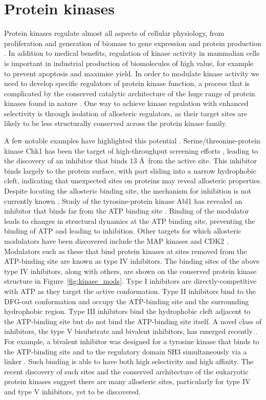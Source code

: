 \section{Protein kinases}

Protein kinases regulate almost all aspects of cellular physiology, from proliferation and generation of biomass to gene expression and protein production \cite{Manning2002}.
In addition to medical benefits, regulation of kinase activity in mammalian cells is important in industrial production of biomolecules of high value, for example to prevent apoptosis and maximise yield.
In order to modulate kinase activity we need to develop specific regulators of protein kinase function, a process that is complicated by the conserved catalytic architecture of the huge range of protein kinases found in nature \cite{Muller2015}.
One way to achieve kinase regulation with enhanced selectivity is through isolation of allosteric regulators, as their target sites are likely to be less structurally conserved across the protein kinase family.

A few notable examples have highlighted this potential \cite{Gavrin2013}.
Serine/threonine-protein kinase Chk1 has been the target of high-throughput screening efforts \cite{Converso2009}, leading to the discovery of an inhibitor that binds 13 \AA\ from the active site.
This inhibitor binds largely to the protein surface, with part sliding into a narrow hydrophobic cleft, indicating that unexpected sites on proteins may reveal allosteric properties.
Despite locating the allosteric binding site, the mechanism for inhibition is not currently known \cite{Vanderpool2009}.
Study of the tyrosine-protein kinase Abl1 has revealed an inhibitor that binds far from the ATP binding site \cite{Zhang2010, Yang2011}.
Binding of the modulator leads to changes in structural dynamics at the ATP binding site, preventing the binding of ATP and leading to inhibition.
Other targets for which allosteric modulators have been discovered include the MAP kinases \cite{Comess2011} and CDK2 \cite{Betzi2011}.
Modulators such as these that bind protein kinases at sites removed from the ATP-binding site are known as type IV inhibitors.
The binding sites of the above type IV inhibitors, along with others, are shown on the conserved protein kinase structure in Figure~\ref{fig:kinase_mods}.
Type I inhibitors are directly-competitive with ATP as they target the active conformation.
Type II inhibitors bind to the DFG-out conformation and occupy the ATP-binding site and the surrounding hydrophobic region.
Type III inhibitors bind the hydrophobic cleft adjacent to the ATP-binding site but do not bind the ATP-binding site itself.
A novel class of inhibitors, the type V bisubstrate and bivalent inhibitors, has emerged recently \cite{Lamba2012}.
For example, a bivalent inhibitor was designed for a tyrosine kinase that binds to the ATP-binding site and to the regulatory domain SH3 simultaneously via a linker \cite{Hill2009}.
Such binding is able to have both high selectivity and high affinity.
The recent discovery of such sites and the conserved architecture of the eukaryotic protein kinases suggest there are many allosteric sites, particularly for type IV and type V inhibitors, yet to be discovered.

